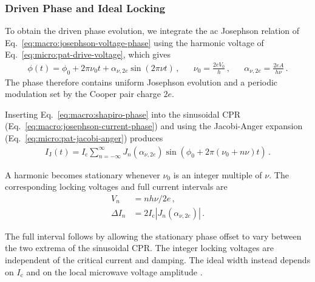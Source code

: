         \subsubsection*{Driven Phase and Ideal Locking}

            To obtain the driven phase evolution, we integrate the ac Josephson relation of Eq.~\eqref{eq:macro:josephson-voltage-phase} using the harmonic voltage of Eq.~\eqref{eq:micro:pat-drive-voltage}, which gives
            \begin{align}
                \phi(t)=\phi_0+2\pi\nu_0t+\alpha_{\nu,2e}\sin(2\pi\nu t)\,, &&
                \nu_0=\frac{2eV_0}{h}\,, &&
                \alpha_{\nu,2e}=\frac{2eA}{h\nu}\,.
                \label{eq:macro:shapiro-phase}
            \end{align}
            The phase therefore contains uniform Josephson evolution and a periodic modulation set by the Cooper pair charge $2e$.

            Inserting Eq.~\eqref{eq:macro:shapiro-phase} into the sinusoidal CPR (Eq.~\ref{eq:macro:josephson-current-phase}) and using the Jacobi-Anger expansion (Eq.~\ref{eq:micro:pat-jacobi-anger}) produces 
            \begin{align}
                I_\mathrm{J}(t)
                    =
                    I_\mathrm{c}
                    \sum_{n=-\infty}^\infty
                    J_n(\alpha_{\nu,2e})
                    \sin\!\left(
                    \phi_0+2\pi(\nu_0+n\nu)t
                    \right)\,.
            \end{align}

            A harmonic becomes stationary whenever $\nu_0$ is an integer multiple of $\nu$. The corresponding locking voltages and full current intervals are
            \begin{equation}
                \begin{aligned}
                    V_n&=nh\nu/2e\,, \\
                    \Delta I_n &=2I_\mathrm{c}\left|J_n\!\left(\alpha_{\nu,2e}\right)\right|\,.
                \end{aligned}
                \label{eq:macro:shapiro-iv}
            \end{equation}

            The full interval follows by allowing the stationary phase offset to vary between the two extrema of the sinusoidal CPR. The integer locking voltages are independent of the critical current and damping. The ideal width instead depends on $I_\mathrm{c}$ and on the local microwave voltage amplitude \cite{shapiro_josephson_1963}.

